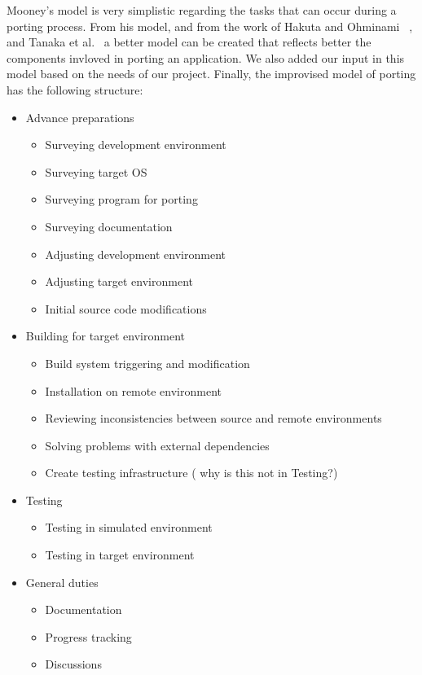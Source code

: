 Mooney's model is very simplistic regarding the tasks that can occur during
a porting process. From his model, and from the work of Hakuta and Ohminami~
\cite{b2}, and Tanaka et al.~\cite{b1} a better model can be created that
reflects better the components invloved in porting an application. We also added
our input in this model based on the needs of our project. Finally, the
improvised model of porting has the following structure:
\begin{itemize}
    \item Advance preparations
        \begin{itemize}
            \item Surveying development environment
            \item Surveying target OS
            \item Surveying program for porting
            \item Surveying documentation
            \item Adjusting development environment
            \item Adjusting target environment
            \item Initial source code modifications
        \end{itemize}
    \item Building for target environment
        \begin{itemize}
            \item Build system triggering and modification
            \item Installation on remote environment
            \item Reviewing inconsistencies between source and remote
            environments
            \item Solving problems with external dependencies
            \item Create testing infrastructure ({\color{red} why is this not in
            Testing?})
        \end{itemize}
    \item Testing
        \begin{itemize}
            \item Testing in simulated environment
            \item Testing in target environment
        \end{itemize}
    \item General duties
        \begin{itemize}
            \item Documentation
            \item Progress tracking
            \item Discussions
        \end{itemize}
\end{itemize}

